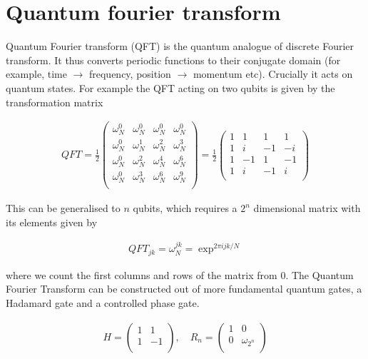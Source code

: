 \section{Quantum fourier transform}

Quantum Fourier transform (QFT) is the quantum analogue of discrete Fourier transform. It thus converts periodic functions to their conjugate domain (for example, time $\rightarrow$ frequency, position $\rightarrow$ momentum etc). Crucially it acts on quantum states. For example the QFT acting on two qubits is given by the transformation matrix 

\begin{align}
    QFT = 
    \frac{1}{2}
    \begin{pmatrix}
        \omega_N^{0} & \omega_N^{0} & \omega_N^0 &\omega_N^0 \\
        \omega_N^0 & \omega_N^1 & \omega_N^2 & \omega_N^3 \\
        \omega_N^0 & \omega_N^2 & \omega_N^4 & \omega_N^6 \\
        \omega_N^0 & \omega_N^3 & \omega_N^6 & \omega_N^9 \\
    \end{pmatrix}
    =
    \frac{1}{2}
    \begin{pmatrix}
        1 & 1 & 1 & 1 \\
        1 & i & -1 & -i \\
        1 & -1 & 1 & -1 \\
        1 & i & -1 & i \\
    \end{pmatrix}
\end{align}

This can be generalised to $n$ qubits, which requires a $2^n$ dimensional matrix with its elements given by 

\begin{align}
    QFT_{jk} = \omega_N^{jk} = \exp^{2\pi ijk / N} 
\end{align}

where we count the first columns and rows of the matrix from 0. The Quantum Fourier Transform can be constructed out of more fundamental quantum gates, a Hadamard gate and a controlled phase gate. 

 \begin{align}
    H = 
    \begin{pmatrix}
    1 & 1 \\
    1 & -1 \\
    \end{pmatrix},
    \quad
    R_n = 
    \begin{pmatrix}
    1 & 0\\
    0 & \omega_{2^n}\\
    \end{pmatrix}
 \end{align}
 
